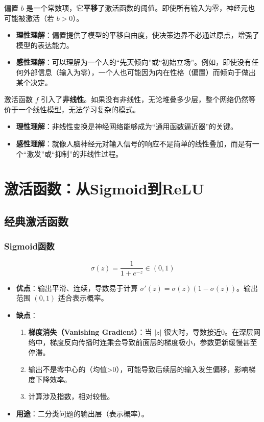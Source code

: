 \begin{definition}[偏置（Bias）]
偏置 $b$ 是一个常数项，它\textbf{平移}了激活函数的阈值。即使所有输入为零，神经元也可能被激活（若 $b > 0$）。
\begin{itemize}
    \item \textbf{理性理解}：偏置提供了模型的平移自由度，使决策边界不必通过原点，增强了模型的表达能力。
    \item \textbf{感性理解}：可以理解为一个人的“先天倾向”或“初始立场”。例如，即使没有任何外部信息（输入为零），一个人也可能因为内在性格（偏置）而倾向于做出某个决定。
\end{itemize}
\end{definition}

\begin{definition}
激活函数 $f$ 引入了\textbf{非线性}。如果没有非线性，无论堆叠多少层，整个网络仍然等价于一个线性模型，无法学习复杂的模式。
\begin{itemize}
    \item \textbf{理性理解}：非线性变换是神经网络能够成为“通用函数逼近器”的关键。
    \item \textbf{感性理解}：就像人脑神经元对输入信号的响应不是简单的线性叠加，而是有一个“激发”或“抑制”的非线性过程。
\end{itemize}
\end{definition}

\section{激活函数：从Sigmoid到ReLU}

\subsection{经典激活函数}

\subsubsection{Sigmoid函数}
\[
\sigma(z) = \frac{1}{1 + e^{-z}} \in (0, 1)
\]
\begin{itemize}
    \item \textbf{优点}：输出平滑、连续，导数易于计算 $\sigma'(z) = \sigma(z)(1-\sigma(z))$。输出范围 $(0,1)$ 适合表示概率。
    \item \textbf{缺点}：
    \begin{enumerate}
        \item \textbf{梯度消失（Vanishing Gradient）}：当 $|z|$ 很大时，导数接近0。在深层网络中，梯度反向传播时连乘会导致前面层的梯度极小，参数更新缓慢甚至停滞。
        \item 输出不是零中心的（均值>0），可能导致后续层的输入发生偏移，影响梯度下降效率。
        \item 计算涉及指数，相对较慢。
    \end{enumerate}
    \item \textbf{用途}：二分类问题的输出层（表示概率）。
\end{itemize}

